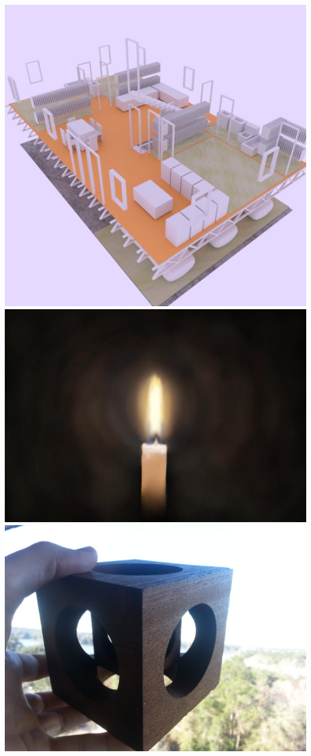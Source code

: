 \documentclass[../resume.tex]{subfiles}
\begin{document}
\noindent
\href{https://twitter.com/randompast/status/763926061264490497}{\includegraphics[scale=0.175]{../fun/house.jpeg}}
\includegraphics[scale=0.2]{../fun/drawing.jpeg} 
\href{https://twitter.com/randompast/status/698518013096628224}{\includegraphics[scale=0.09]{../fun/cube.jpeg}}
\end{document}
